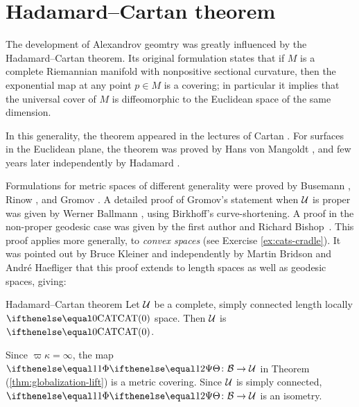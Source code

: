 
\section{Hadamard--Cartan theorem}\label{sec:Hadamard--Cartan}

The development of Alexandrov geomtry was greatly influenced by the Hadamard--Cartan theorem.
Its original formulation states that if $M$ is a complete Riemannian manifold with nonpositive sectional curvature, 
then the exponential map at any point $p\in M$ is a covering;
in particular it implies that the universal cover of $M$ is diffeomorphic to the Euclidean space of the same dimension.

In this generality, the theorem appeared in the lectures of Cartan \cite{cartan}.
For surfaces in the Euclidean plane, 
the theorem was proved by
Hans von Mangoldt \cite{mangoldt},  
and few years later independently by Hadamard \cite{hadamard}.

Formulations for metric spaces of different generality were proved by 
Busemann \cite{busemann-CBA},
Rinow \cite{rinow}, and 
Gromov  \cite[p.~119]{gromov:hyp-groups}. 
A detailed proof of Gromov's statement when $\mathcal{U}$ is proper  was given by Werner Ballmann \cite{ballmann:cartan-hadamard}, using Birkhoff's curve-shortening.  
A proof in the non-proper 
geodesic case 
was given by the first author and Richard Bishop~\cite{alexander-bishop:h-c}.  
This proof applies more generally, to \emph{convex spaces} (see Exercise \ref{ex:cats-cradle}).
It was pointed out by Bruce 
Kleiner \cite{ballmann:lectures} 
and independently by Martin 
Bridson and Andr\'{e} 
Haefliger \cite{bridson-haefliger} that 
this proof
extends to length spaces as well as geodesic spaces, giving:

\begin{thm}{Hadamard--Cartan theorem}
\label{thm:hadamard-cartan}
Let $\mathcal{U}$ be a complete,  simply connected length locally $\CAT0$ space.
Then $\mathcal{U}$ is $\CAT0$.
\end{thm}

 Since $\varpi\kappa=\infty$,
the map $\map\:\spc{B}\to\spc{U}$ in Theorem
 (\ref{thm:globalization-lift}) is a metric covering. 
Since $\mathcal{U}$ is simply connected, $\map\:\spc{B}\to\spc{U}$ is an isometry.
\qeds

